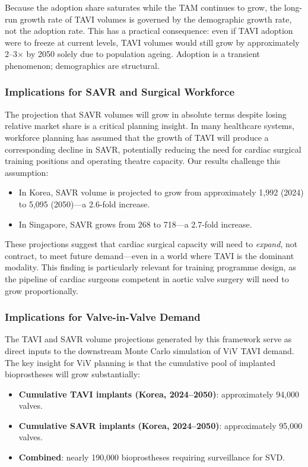 \documentclass[12pt, a4paper]{article}
\begin{document}
Because the adoption share saturates while the TAM continues to grow, the long-run growth rate of TAVI volumes is governed by the demographic growth rate, not the adoption rate. This has a practical consequence: even if TAVI adoption were to freeze at current levels, TAVI volumes would still grow by approximately 2--3$\times$ by 2050 solely due to population ageing. Adoption is a transient phenomenon; demographics are structural.

\subsubsection{Implications for SAVR and Surgical Workforce}

The projection that SAVR volumes will grow in absolute terms despite losing relative market share is a critical planning insight. In many healthcare systems, workforce planning has assumed that the growth of TAVI will produce a corresponding decline in SAVR, potentially reducing the need for cardiac surgical training positions and operating theatre capacity. Our results challenge this assumption:

\begin{itemize}[leftmargin=*, itemsep=4pt]
    \item In Korea, SAVR volume is projected to grow from approximately 1{,}992 (2024) to 5{,}095 (2050)---a 2.6-fold increase.
    \item In Singapore, SAVR grows from 268 to 718---a 2.7-fold increase.
\end{itemize}

These projections suggest that cardiac surgical capacity will need to \emph{expand}, not contract, to meet future demand---even in a world where TAVI is the dominant modality. This finding is particularly relevant for training programme design, as the pipeline of cardiac surgeons competent in aortic valve surgery will need to grow proportionally.

\subsubsection{Implications for Valve-in-Valve Demand}

The TAVI and SAVR volume projections generated by this framework serve as direct inputs to the downstream Monte Carlo simulation of ViV TAVI demand. The key insight for ViV planning is that the cumulative pool of implanted bioprostheses will grow substantially:

\begin{itemize}[leftmargin=*, itemsep=4pt]
    \item \textbf{Cumulative TAVI implants (Korea, 2024--2050)}: approximately 94{,}000 valves.
    \item \textbf{Cumulative SAVR implants (Korea, 2024--2050)}: approximately 95{,}000 valves.
    \item \textbf{Combined}: nearly 190{,}000 bioprostheses requiring surveillance for SVD.
\end{itemize}
\end{document}
